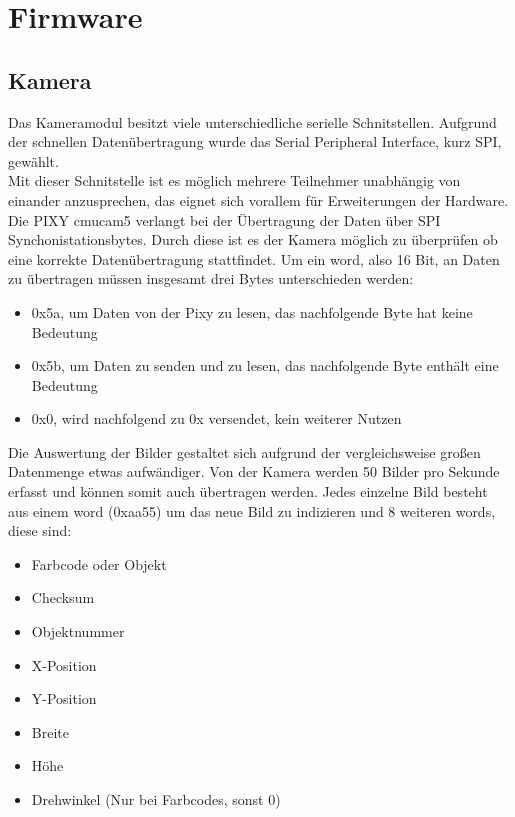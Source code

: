 \chapter{Firmware}

\renewcommand{\kapitelautor}{Autor: Lucas Ullrich}

\section{Kamera}
Das Kameramodul besitzt viele unterschiedliche serielle Schnitstellen. Aufgrund der schnellen Datenübertragung wurde das Serial Peripheral Interface, kurz SPI, gewählt.\\
Mit dieser Schnitstelle ist es möglich mehrere Teilnehmer unabhängig von einander anzusprechen, das eignet sich vorallem für Erweiterungen der Hardware.\\
Die PIXY cmucam5 verlangt bei der Übertragung der Daten über SPI Synchonistationsbytes. Durch diese ist es der Kamera möglich zu überprüfen ob eine korrekte Datenübertragung stattfindet. Um ein word, also 16 Bit, an Daten zu übertragen müssen insgesamt drei Bytes unterschieden werden:
\begin{itemize}
\item 0x5a, um Daten von der Pixy zu lesen, das nachfolgende Byte hat keine Bedeutung
\item 0x5b, um Daten zu senden und zu lesen, das nachfolgende Byte enthält eine Bedeutung
\item 0x0, wird nachfolgend zu 0x versendet, kein weiterer Nutzen
\end{itemize}

Die Auswertung der Bilder gestaltet sich aufgrund der vergleichsweise großen Datenmenge etwas aufwändiger. Von der Kamera werden 50 Bilder pro Sekunde erfasst und können somit auch übertragen werden. Jedes einzelne Bild besteht aus einem word (0xaa55) um das neue Bild zu indizieren und 8 weiteren words, diese sind:
\begin{itemize}
\item Farbcode oder Objekt
\item Checksum
\item Objektnummer
\item X-Position
\item Y-Position
\item Breite
\item Höhe
\item Drehwinkel (Nur bei Farbcodes, sonst 0)
\end{itemize}

